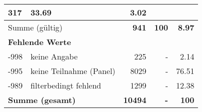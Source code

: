 \begin{longtable}{lXrrr}
       \num{317} &
       \num[round-mode=places,round-precision=2]{33.69} &
         \num[round-mode=places,round-precision=2]{3.02} \\
     \midrule
     \multicolumn{2}{l}{Summe (gültig)} &
       \textbf{\num{941}} &
     \textbf{\num{100}} &
       \textbf{\num[round-mode=places,round-precision=2]{8.97}} \\
     \multicolumn{5}{l}{\textbf{Fehlende Werte}}\\
       -998 &
       keine Angabe &
         \num{225} &
        - &
         \num[round-mode=places,round-precision=2]{2.14} \\
       -995 &
       keine Teilnahme (Panel) &
         \num{8029} &
        - &
         \num[round-mode=places,round-precision=2]{76.51} \\
       -989 &
       filterbedingt fehlend &
         \num{1299} &
        - &
         \num[round-mode=places,round-precision=2]{12.38} \\
     \midrule
     \multicolumn{2}{l}{\textbf{Summe (gesamt)}} &
          \textbf{\num{10494}} &
        \textbf{-} &
        \textbf{\num{100}} \\
     \bottomrule
     \end{longtable}
     
